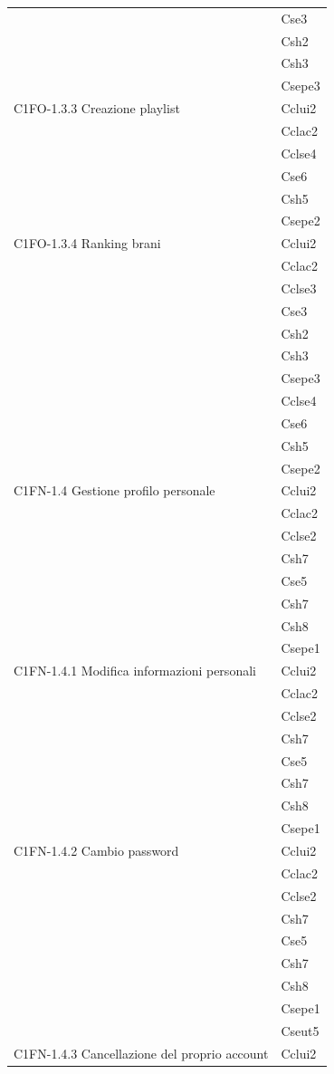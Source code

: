 \begin{footnotesize}
\begin{longtable}[!h]{|l|l|}
& Cse3\\
& Csh2\\
& Csh3\\
& Csepe3\\\hline   
C1FO-1.3.3 Creazione playlist & Cclui2\\
& Cclac2\\
& Cclse4\\
& Cse6\\
& Csh5\\
& Csepe2\\\hline  
C1FO-1.3.4 Ranking brani & Cclui2\\
& Cclac2\\
& Cclse3\\
& Cse3\\
& Csh2\\
& Csh3\\
& Csepe3\\
& Cclse4\\
& Cse6\\
& Csh5\\
& Csepe2  \\\hline             
C1FN-1.4 Gestione profilo personale & Cclui2\\
& Cclac2\\
& Cclse2\\
& Csh7\\
& Cse5\\
& Csh7\\
& Csh8\\
& Csepe1\\\hline 
C1FN-1.4.1 Modifica informazioni personali & Cclui2\\
& Cclac2\\
& Cclse2\\
& Csh7\\
& Cse5\\
& Csh7\\
& Csh8\\
& Csepe1\\\hline  
C1FN-1.4.2 Cambio password & Cclui2 \\
& Cclac2\\
& Cclse2\\
& Csh7\\
& Cse5\\
& Csh7\\
& Csh8\\
& Csepe1\\
& Cseut5\\\hline  
C1FN-1.4.3 Cancellazione del proprio account & Cclui2\\

\end{longtable}
\end{footnotesize}
